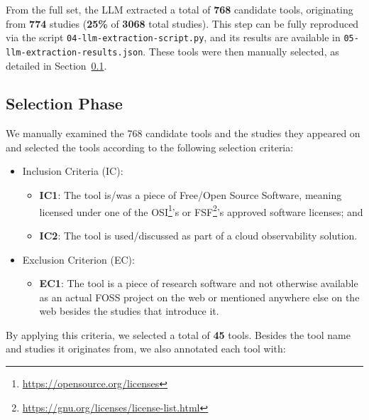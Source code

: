 \documentclass[sigconf]{acmart}
\begin{document}
From the full set, the LLM extracted a total of \textbf{768} candidate
tools, originating from \textbf{774} studies (\textbf{25\%} of
\textbf{3068} total studies). This step can be fully reproduced via the
script \texttt{04-\allowbreak llm-\allowbreak extraction-\allowbreak script.\allowbreak py}, and its results are
available in \texttt{05-\allowbreak llm-\allowbreak extraction-\allowbreak results.\allowbreak json}. These tools were
then manually selected, as detailed in
Section~\ref{selection-phase}.

\subsection{Selection Phase}\label{selection-phase}

We manually examined the 768 candidate tools and the studies they
appeared on and selected the tools according to the following selection
criteria:

\begin{itemize}
\item
  Inclusion Criteria (IC):

  \begin{itemize}
  \item
    \textbf{IC1}: The tool is/was a piece of Free/Open Source Software,
    meaning licensed under one of the OSI\footnote{\url{https://opensource.org/licenses}}'s
    or FSF\footnote{\url{https://gnu.org/licenses/license-list.html}}'s
    approved software licenses; and
  \item
    \textbf{IC2}: The tool is used/discussed as part of a cloud
    observability solution.
  \end{itemize}
\item
  Exclusion Criterion (EC):

  \begin{itemize}
  \item
    \textbf{EC1}: The tool is a piece of research software and not
    otherwise available as an actual FOSS project on the web or
    mentioned anywhere else on the web besides the studies that
    introduce it.
  \end{itemize}
\end{itemize}

By applying this criteria, we selected a total of \textbf{45} tools. Besides the
tool name and studies it originates from, we also annotated each tool with:
\end{document}
